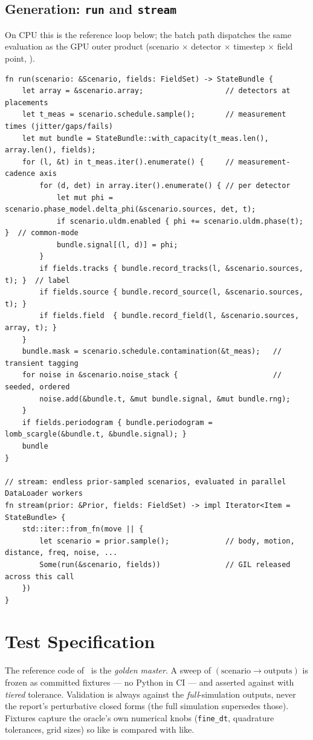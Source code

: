 \documentclass[11pt,a4paper]{article}
\theoremstyle{reqstyle}
\begin{document}
\subsection{Generation: \texttt{run} and \texttt{stream}}
On CPU this is the reference loop below; the batch path dispatches the same evaluation as the
GPU outer product (scenario $\times$ detector $\times$ timestep $\times$ field point,
).
\begin{lstlisting}
fn run(scenario: &Scenario, fields: FieldSet) -> StateBundle {
    let array = &scenario.array;                   // detectors at placements
    let t_meas = scenario.schedule.sample();       // measurement times (jitter/gaps/fails)
    let mut bundle = StateBundle::with_capacity(t_meas.len(), array.len(), fields);
    for (l, &t) in t_meas.iter().enumerate() {     // measurement-cadence axis
        for (d, det) in array.iter().enumerate() { // per detector
            let mut phi = scenario.phase_model.delta_phi(&scenario.sources, det, t);
            if scenario.uldm.enabled { phi += scenario.uldm.phase(t); }  // common-mode
            bundle.signal[(l, d)] = phi;
        }
        if fields.tracks { bundle.record_tracks(l, &scenario.sources, t); }  // label
        if fields.source { bundle.record_source(l, &scenario.sources, t); }
        if fields.field  { bundle.record_field(l, &scenario.sources, array, t); }
    }
    bundle.mask = scenario.schedule.contamination(&t_meas);   // transient tagging
    for noise in &scenario.noise_stack {                      // seeded, ordered
        noise.add(&bundle.t, &mut bundle.signal, &mut bundle.rng);
    }
    if fields.periodogram { bundle.periodogram = lomb_scargle(&bundle.t, &bundle.signal); }
    bundle
}

// stream: endless prior-sampled scenarios, evaluated in parallel DataLoader workers
fn stream(prior: &Prior, fields: FieldSet) -> impl Iterator<Item = StateBundle> {
    std::iter::from_fn(move || {
        let scenario = prior.sample();             // body, motion, distance, freq, noise, ...
        Some(run(&scenario, fields))               // GIL released across this call
    })
}
\end{lstlisting}

\section{Test Specification}
\label{sec:tests}

The reference code of~\cite{parish2026} is the \emph{golden master}. A sweep of
$(\text{scenario}\to\text{outputs})$ is frozen as committed fixtures --- no Python in CI ---
and asserted against with \emph{tiered} tolerance. Validation is always against the
\emph{full}-simulation outputs, never the report's perturbative closed forms (the full
simulation supersedes those). Fixtures capture the oracle's own numerical knobs
(\texttt{fine\_dt}, quadrature tolerances, grid sizes) so like is compared with like.
\end{document}
